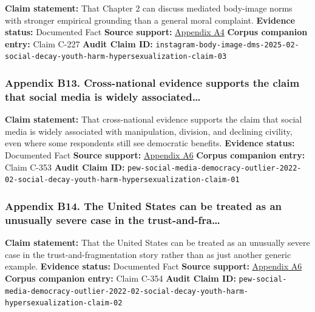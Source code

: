 \documentclass[
  american,
  11pt,
  letterpaper,
]{article}
\begin{document}
\textbf{Claim statement:} That Chapter 2 can discuss mediated body-image
norms with stronger empirical grounding than a general moral complaint.
\textbf{Evidence status:} Documented Fact \textbf{Source support:}
\hyperref[ch-02-appendix-a4-unfiltered-how-teens-engage-in-body-image-and-shaming-discussions-via-instagram-direct-messages-dms]{Appendix
A4} \textbf{Corpus companion entry:} Claim C-227 \textbf{Audit Claim
ID:}
\texttt{instagram-body-image-dms-2025-02-social-decay-youth-harm-hypersexualization-claim-03}

\subsubsection{Appendix B13. Cross-national evidence supports the claim
that social media is widely
associated\ldots{}}\label{ch-02-appendix-b13-cross-national-evidence-supports-the-claim-that-social-media-is-widely-associated}

\textbf{Claim statement:} That cross-national evidence supports the
claim that social media is widely associated with manipulation,
division, and declining civility, even where some respondents still see
democratic benefits. \textbf{Evidence status:} Documented Fact
\textbf{Source support:}
\hyperref[ch-02-appendix-a6-social-media-seen-as-mostly-good-for-democracy-across-many-nations-but-u-s-is-a-major-outlier]{Appendix
A6} \textbf{Corpus companion entry:} Claim C-353 \textbf{Audit Claim
ID:}
\texttt{pew-social-media-democracy-outlier-2022-02-social-decay-youth-harm-hypersexualization-claim-01}

\subsubsection{Appendix B14. The United States can be treated as an
unusually severe case in the
trust-and-fra\ldots{}}\label{ch-02-appendix-b14-the-united-states-can-be-treated-as-an-unusually-severe-case-in-the-trust-and-fra}

\textbf{Claim statement:} That the United States can be treated as an
unusually severe case in the trust-and-fragmentation story rather than
as just another generic example. \textbf{Evidence status:} Documented
Fact \textbf{Source support:}
\hyperref[ch-02-appendix-a6-social-media-seen-as-mostly-good-for-democracy-across-many-nations-but-u-s-is-a-major-outlier]{Appendix
A6} \textbf{Corpus companion entry:} Claim C-354 \textbf{Audit Claim
ID:}
\texttt{pew-social-media-democracy-outlier-2022-02-social-decay-youth-harm-hypersexualization-claim-02}
\end{document}
